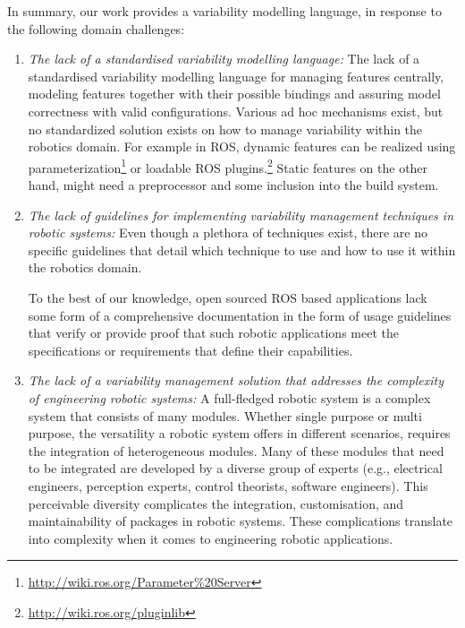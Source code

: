 \documentclass[conference]{IEEEtran}
\newcommand{\foot}[1]{\footnote{\url{#1}}}
\begin{document}
In summary, our work provides a variability modelling language, in response to the following domain challenges:
\begin{enumerate}
    \item \textit{The lack of a standardised variability modelling language: }The lack of a standardised variability modelling language for managing features centrally, modeling features together with their possible bindings and assuring model correctness with valid configurations. Various ad hoc mechanisms exist, but no standardized solution exists on how to manage variability within the robotics domain. For example in ROS, dynamic features can be realized using parameterization\foot{http://wiki.ros.org/Parameter\%20Server} or loadable ROS plugins.\foot{http://wiki.ros.org/pluginlib} Static features on the other hand, might need a preprocessor and some inclusion into the build system.
    
    \item \textit{The lack of guidelines for implementing variability management techniques in robotic systems:} Even though a plethora of techniques exist, there are no specific guidelines that detail which technique to use and how to use it within the robotics domain.
    
    To the best of our knowledge, open sourced ROS based applications lack some form of a comprehensive documentation in the form of usage guidelines that verify or provide proof that such robotic applications meet the specifications or requirements that define their capabilities.
    
    \item \textit{The lack of a variability management solution that addresses the complexity of engineering robotic systems: }A full-fledged robotic system is a complex system that consists of many modules. Whether single purpose or multi purpose, the versatility a robotic system offers in different scenarios, requires the integration of heterogeneous modules. Many of these modules that need to be integrated are developed by a diverse group of experts (e.g., electrical engineers, perception experts, control theorists, software engineers). This perceivable diversity complicates the integration, customisation, and maintainability of packages in robotic systems. These complications translate into complexity when it comes to engineering robotic applications.
\end{enumerate}
\end{document}
